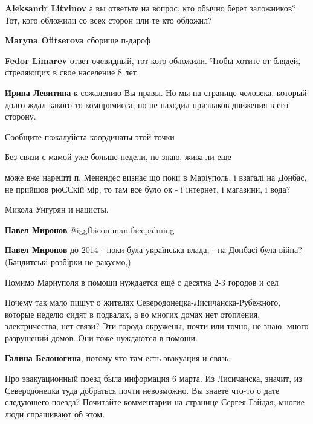 \begin{itemize}
\begin{itemize}
\textbf{Aleksandr Litvinov} а вы ответьте на вопрос, кто обычно берет заложников? Тот, кого обложили со всех сторон или те кто обложил?

\textbf{Maryna Ofitserova} сборище п-дароф

\textbf{Fedor Limarev} ответ очевидный, тот кого обложили. Чтобы хотите от блядей, стреляющих в свое население 8 лет.

\textbf{Ирина Левитина} к сожалению Вы правы. Но мы на странице человека, который долго ждал какого-то компромисса, но не находил признаков движения в его сторону.

\end{itemize} %

Сообщите пожалуйста координаты этой точки

Без связи с мамой уже больше недели, не знаю, жива ли еще


може вже нарешті п. Менендес визнає що поки в Маріуполь, і взагалі на Донбас,
не прийшов рюССкій мір, то там все було ок - і інтернет, і магазини, і вода?

\begin{itemize} %
Микола Унгурян и нацисты.

\textbf{Павел Миронов}  @igg{fbicon.man.facepalming} 

\textbf{Павел Миронов} до 2014 - поки була українська влада, - на Донбасі була війна? (Бандитські розбірки не рахуємо,)
\end{itemize} %

Помимо Мариуполя в помощи нуждается ещё с десятка 2-3 городов и сел


Почему так мало пишут о жителях Северодонецка-Лисичанска-Рубежного, которые
неделю сидят в подвалах, а во многих домах нет отопления, электричества, нет
связи? Эти города окружены, почти или точно, не знаю, много разрушений домов.
Они тоже нуждаются в помощи.

\begin{itemize} %
\textbf{Галина Белоногина}, потому что там есть эвакуация и связь.


Про эвакуационный поезд была информация 6 марта. Из Лисичанска, значит, из
Северодонецка туда добраться почти невозможно. Вы знаете что-то о дате
следующего поезда? Почитайте комментарии на странице Сергея Гайдая, многие люди
спрашивают об этом.


\end{itemize}
\end{itemize}
